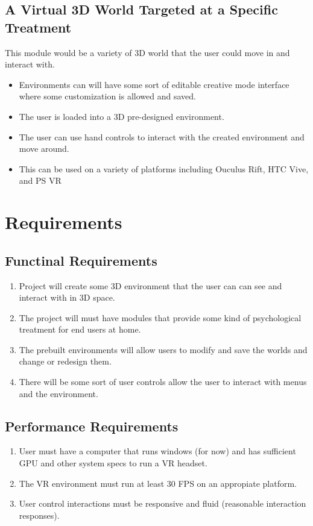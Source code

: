 \documentclass[a4paper,10pt]{article}
\begin{document}
	\subsection{A Virtual 3D World Targeted at a Specific Treatment}
	This module would be a variety of 3D world that the user could move in and interact with. 
	\begin{itemize}
		\item Environments can will have some sort of editable creative mode interface where some customization is allowed and saved.
		\item The user is loaded into a 3D pre-designed environment.
		\item The user can use hand controls to interact with the created environment and move around. 
		\item This can be used on a variety of platforms including Ouculus Rift, HTC Vive, and PS VR
	\end{itemize}
	\pagebreak
	
	\section{Requirements}
	\subsection{Functinal Requirements}
	\begin{enumerate}
		\item Project will create some 3D environment that the user can can see and interact with in 3D space.
		\item The project will must have modules that provide some kind of psychological treatment for end users at home.
		\item The prebuilt environments will allow users to modify and save the worlds and change or redesign them.
		\item There will be some sort of user controls allow the user to interact with menus and the environment.
	\end{enumerate}
	
	\subsection{Performance Requirements}
	\begin{enumerate}
		\item User must have a computer that runs windows (for now) and has sufficient GPU and other system specs to run a VR headset.
		\item The VR environment must run at least 30 FPS on an appropiate platform.
		\item User control interactions must be responsive and fluid (reasonable interaction responses).
	\end{enumerate}
\end{document}
